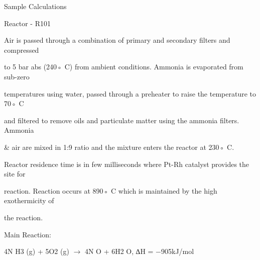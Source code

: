 \documentclass[a4paper,portrait,12pt]{article}
\begin{document}
\begin{flushleft}
Sample Calculations
\end{flushleft}


\begin{flushleft}
Reactor - R101
\end{flushleft}





\begin{flushleft}
Air is passed through a combination of primary and secondary filters and compressed
\end{flushleft}


\begin{flushleft}
to 5 bar abs (240◦ C) from ambient conditions. Ammonia is evaporated from sub-zero
\end{flushleft}


\begin{flushleft}
temperatures using water, passed through a preheater to raise the temperature to 70◦ C
\end{flushleft}


\begin{flushleft}
and filtered to remove oils and particulate matter using the ammonia filters. Ammonia
\end{flushleft}


\begin{flushleft}
\& air are mixed in 1:9 ratio and the mixture enters the reactor at 230◦ C.
\end{flushleft}


\begin{flushleft}
Reactor residence time is in few milliseconds where Pt-Rh catalyst provides the site for
\end{flushleft}


\begin{flushleft}
reaction. Reaction occurs at 890◦ C which is maintained by the high exothermicity of
\end{flushleft}


\begin{flushleft}
the reaction.
\end{flushleft}


\begin{flushleft}
Main Reaction:
\end{flushleft}


\begin{flushleft}
4N H3 (g) + 5O2 (g) $\rightarrow$ 4N O + 6H2 O, ∆H = $-$905kJ/mol
\end{flushleft}
\end{document}
